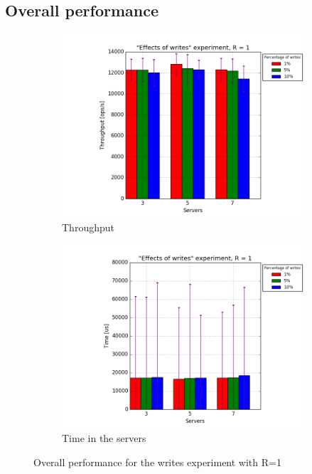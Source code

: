 \documentclass[11pt]{article}
\begin{document}
\subsection{Overall performance}

\begin{figure}
\centering
\begin{subfigure}{.5\textwidth}
	\centering
	\includegraphics[width=\linewidth]{plots/writes-1-replication}
	\caption{Throughput}
	\label{fig:writes-throughput-1}
\end{subfigure}%
\begin{subfigure}{.5\textwidth}
	\centering
	\includegraphics[width=\linewidth]{plots/writes-response_time-1-replication}
	\caption{Time in the servers}
	\label{fig:writes-reponse-time-1}
\end{subfigure}
\caption{Overall performance for the writes experiment with R=1}
\label{fig:writes-overall}
\end{figure}
\end{document}
